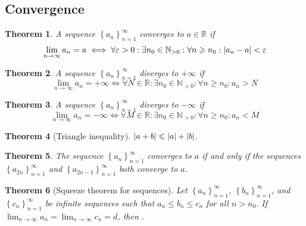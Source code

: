 \documentclass{article}
\newcommand*{\N}{\mathbb{N}}
\newcommand*{\R}{\mathbb{R}}
\theoremstyle{plain}
\newtheorem{theorem}{Theorem}[section]
\numberwithin{theorem}{subsection}
\theoremstyle{definition}
\numberwithin{definition}{subsection}
\theoremstyle{remark}
\numberwithin{note}{subsection}
\begin{document}
\subsection{Convergence}
\begin{theorem}
    A sequence $\left\{a_n\right\}_{n=1}^\infty$ converges to $a\in \R$ if
    \begin{equation*}
        \lim_{n \to \infty}a_n = a \iff \forall \varepsilon > 0 : \exists n_0 \in \N_{> 0}:\forall n \geqslant n_0 : \abs{a_n - a} < \varepsilon
    \end{equation*}
\end{theorem}
%
\begin{theorem}
    A sequence $\left\{a_n\right\}_{n=1}^\infty$ diverges to $+\infty$ if
    \begin{equation*}
        \lim_{n \to \infty}a_n = +\infty \iff \forall N \in \R : \exists n_0 \in \N_{> 0}:\forall n \geqslant n_0 : a_n > N
    \end{equation*}
\end{theorem}
%
\begin{theorem}
    A sequence $\left\{a_n\right\}_{n=1}^\infty$ diverges to $-\infty$ if
    \begin{equation*}
        \lim_{n \to \infty}a_n = -\infty \iff \forall M \in \R : \exists n_0 \in \N_{> 0}:\forall n \geqslant n_0 : a_n < M
    \end{equation*}
\end{theorem}
%
\begin{theorem}[Triangle inequality]
    $\abs{a+b}\leqslant\abs{a}+\abs{b}$.
\end{theorem}
%
\begin{theorem}
    The sequence $\left\{ a_n \right\}_{n=1}^\infty$ converges to $a$ if and only if the sequences $\left\{ a_{2n} \right\}_{n=1}^\infty$ and $\left\{ a_{2n-1} \right\}_{n=1}^\infty$ both converge to $a$.
\end{theorem}
%
\begin{theorem}[Squeeze theorem for sequences]
    Let $\left\{ a_n \right\}_{n=1}^\infty$, $\left\{ b_n \right\}_{n=1}^\infty$, and $\left\{ c_n \right\}_{n=1}^\infty$ be infinite sequences such that $a_n \leqslant b_n \leqslant c_n$ for all $n>n_0$. If $\lim_{n\to\infty}a_n=\lim_{n\to\infty}c_n=d$, then .
\end{theorem}
%
\end{document}

